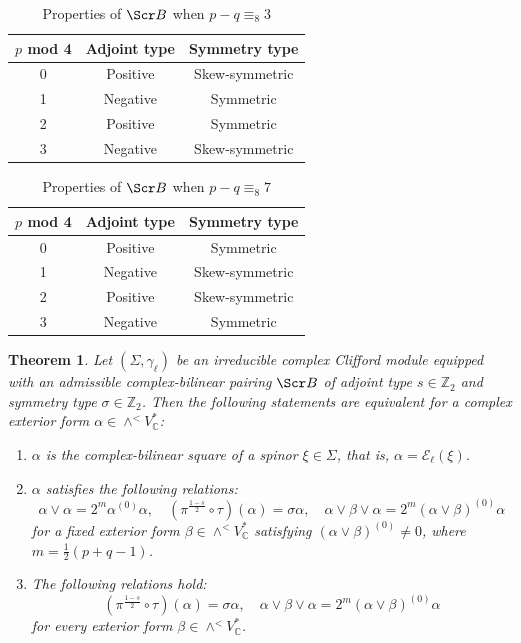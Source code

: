 \documentclass[10pt,a4paper,twoside,reqno]{amsart}
\theoremstyle{plain}
\newtheorem{thm}{Theorem}[section]
\theoremstyle{definition}
\theoremstyle{remark}
\def\C{\mathbb{C}}
\def\scB{\Scr B}
\def\cE{\mathcal{E}}
\begin{document}
\begin{table}
\centering
\caption{Properties of $\scB$ when $p-q\equiv_8 3$}
\label{tab:symmetry_parity3}
\renewcommand{\arraystretch}{1.3} %
\begin{tabular}{|c|c|c|}
\hline
\textbf{$p$ mod 4} & \textbf{Adjoint type} & \textbf{Symmetry type} \\ \hline
0 & Positive & Skew-symmetric \\ \hline
1 & Negative & Symmetric \\ \hline
2 & Positive & Symmetric \\ \hline
3 & Negative & Skew-symmetric \\ \hline
\end{tabular}
\end{table}

\begin{table}
\centering
\caption{Properties of $\scB$ when $p-q\equiv_8 7$}
\label{tab:symmetry_parity7}
\renewcommand{\arraystretch}{1.3} %
\begin{tabular}{|c|c|c|}
\hline
\textbf{$p$ mod 4} & \textbf{Adjoint type} & \textbf{Symmetry type} \\ \hline
0 & Positive & Symmetric \\ \hline
1 & Negative & Skew-symmetric \\ \hline
2 & Positive & Skew-symmetric \\ \hline
3 & Negative & Symmetric \\ \hline
\end{tabular}
\end{table}

\begin{thm}
\label{thm:odd_complex-bilinear_square}
Let $(\Sigma,\gamma_\ell)$ be an irreducible complex Clifford module equipped with an admissible complex-bilinear pairing $\scB$ of adjoint type $s\in\mathbb{Z}_2$ and symmetry type $\sigma\in\mathbb{Z}_2$. Then the following statements are equivalent for a complex exterior form $\alpha\in\wedge^<V^*_\C$: 
\begin{enumerate}
\item[\normalfont(a)] $\alpha$ is the complex-bilinear square of a spinor $\xi\in\Sigma$, that is, $\alpha=\cE_\ell(\xi)$.
\item[\normalfont(b)] $\alpha$ satisfies the following relations: $$\alpha\vee\alpha=2^m\alpha^{(0)}\alpha,\quad(\pi^{\frac{1-s}{2}}\circ\tau)(\alpha)=\sigma\alpha,\quad\alpha\vee\beta\vee\alpha=2^m(\alpha\vee\beta)^{(0)}\alpha$$ for a fixed exterior form $\beta\in\wedge^<V^*_\C$ satisfying $(\alpha\vee\beta)^{(0)}\neq0$, where $m=\frac{1}{2}(p+q-1)$.
\item[\normalfont(c)] The following relations hold: $$(\pi^{\frac{1-s}{2}}\circ\tau)(\alpha)=\sigma\alpha,\quad\alpha\vee\beta\vee\alpha=2^m(\alpha\vee\beta)^{(0)}\alpha$$ for every exterior form $\beta\in\wedge^<V^*_\C$.
\end{enumerate}
\end{thm}
\end{document}

